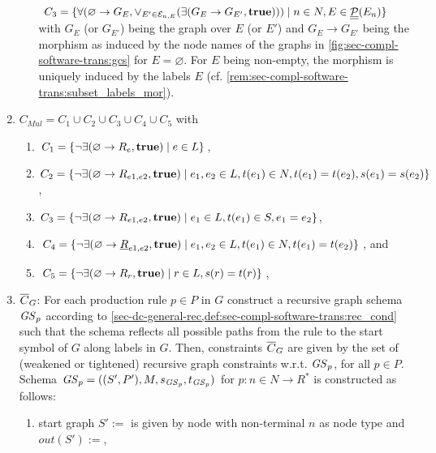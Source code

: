 \begin{definition}
\begin{enumerate}
\begin{enumerate}
  	$C_3=\{\forall(\varnothing \to G_E,\vee_{E' \in \mathcal{E}_{n,E}}(\exists(G_E \to G_{E'},\textbf{true}))) \mid n \in N, E \in \underline{\underline{\mathcal{P}}}(E_n)\}$ with $G_E$ (or $G_{E'}$) being the graph over $E$ (or $E'$) and $G_E \to G_{E'}$ being the morphism as induced by the node names of the graphs in \cref{fig:sec-compl-software-trans:gcs} for $E=\varnothing$.
  	For $E$ being non-empty, the morphism is uniquely induced by the labels $E$ (cf. \cref{rem:sec-compl-software-trans:subset_labels_mor}).
  \end{enumerate}
  \item $C_{Mul}=C_1 \cup C_2 \cup C_3 \cup C_4 \cup C_5$ with
  \begin{enumerate}
    \item $C_1=\{\neg\exists(\varnothing \to R_e,\textbf{true}) \mid e \in L\}$,
    \item $C_2=\{\neg\exists(\varnothing \to R_{e1,e2},\textbf{true}) \mid e_1,e_2 \in L,t(e_1) \in N,t(e_1)=t(e_2),s(e_1)=s(e_2)\}$,
    \item $C_3=\{\neg\exists(\varnothing \to R_{e1,e2},\textbf{true}) \mid e_1 \in L,t(e_1) \in S,e_1=e_2\}$,
    \item $C_4=\{\neg\exists(\varnothing \to \underline{R}_{e1,e2},\textbf{true}) \mid e_1,e_2 \in L,t(e_1) \in N,t(e_1)=t(e_2)\}$, and
    \item $C_5=\{\neg\exists(\varnothing \to R_r,\textbf{true}) \mid r \in L,s(r)=t(r)\}$,
  \end{enumerate}
  \item $\overline{C}_G$: For each production rule $p \in P$ in $G$ construct a recursive graph schema $\mathit{GS}_p$ according to \cref{sec-dc-general-rec,def:sec-compl-software-trans:rec_cond} such that the schema reflects all possible paths from the rule to the start symbol of $G$ along labels in $G$.
  Then, constraints $\overline{C}_G$ are given by the set of (weakened or tightened) recursive graph constraints w.r.t. $\mathit{GS}_p$, for all $p \in P$.
  Schema $\mathit{GS}_p=((S',P'),M,s_{\mathit{GS}_p},t_{\mathit{GS}_p})$ for $p\colon n \in N \to R^*$ is constructed as follows:
  \begin{enumerate}
    \item start graph $S':=$ is given by node  with non-terminal $n$ as node type and $out(S'):=$,

\end{enumerate}
\end{enumerate}
\end{definition}
